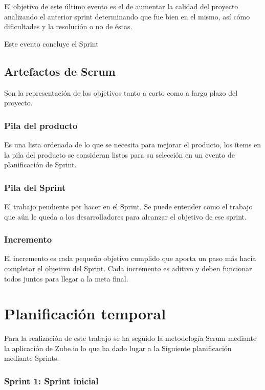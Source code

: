 El objetivo de este último evento es el de aumentar la calidad del proyecto analizando el anterior sprint determinando que fue bien en el mismo, así cómo dificultades y la resolución o no de éstas.

Este evento concluye el Sprint

\subsection{Artefactos de Scrum}

Son la representación de los objetivos tanto a corto como a largo plazo del proyecto.

\subsubsection{Pila del producto}

Es una lista ordenada de lo que se necesita para mejorar el producto, los ítems en la pila del producto se consideran listos para su selección en un evento de planificación de Sprint.

\subsubsection{Pila del Sprint}

El trabajo pendiente por hacer en el Sprint. Se puede entender como el trabajo que aún le queda a los desarrolladores para alcanzar el objetivo de ese sprint.

\subsubsection{Incremento}

El incremento es cada pequeño objetivo cumplido que aporta un paso más hacia completar el objetivo del Sprint. Cada incremento es aditivo y deben funcionar todos juntos para llegar a la meta final. \cite{schwaber2020guia}


\section{Planificación temporal}

Para la realización de este trabajo se ha seguido la metodología Scrum mediante la aplicación de Zube.io lo que ha dado lugar a la Siguiente planificación mediante Sprints.

\subsubsection{Sprint 1: Sprint inicial}

